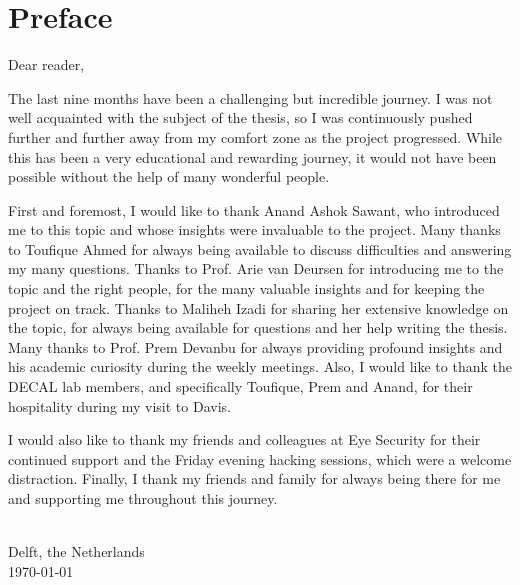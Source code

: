 \chapter{\label{cha:Preface}Preface}
Dear reader,

The last nine months have been a challenging but incredible journey. I was not well acquainted with the subject of the thesis, so I was continuously pushed further and further away from my comfort zone as the project progressed. While this has been a very educational and rewarding journey, it would not have been possible without the help of many wonderful people.

First and foremost, I would like to thank Anand Ashok Sawant, who introduced me to this topic and whose insights were invaluable to the project. Many thanks to Toufique Ahmed for always being available to discuss difficulties and answering my many questions. Thanks to Prof. Arie van Deursen for introducing me to the topic and the right people, for the many valuable insights and for keeping the project on track. Thanks to Maliheh Izadi for sharing her extensive knowledge on the topic, for always being available for questions and her help writing the thesis. Many thanks to Prof. Prem Devanbu for always providing profound insights and his academic curiosity during the weekly meetings. Also, I would like to thank the DECAL lab members, and specifically Toufique, Prem and Anand, for their hospitality during my visit to Davis.

I would also like to thank my friends and colleagues at Eye Security for their continued support and the Friday evening hacking sessions, which were a welcome distraction. Finally, I thank my friends and family for always being there for me and supporting me throughout this journey.
\vskip1cm
\begin{flushright}
\theauthor\\
Delft, the Netherlands \\
\today\\
\end{flushright}
